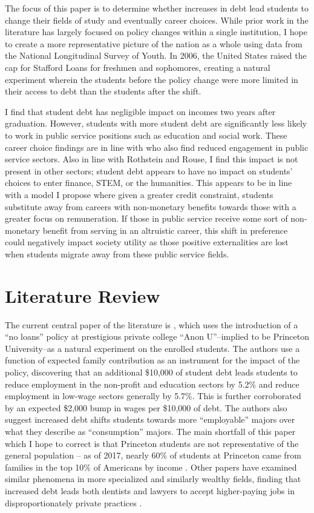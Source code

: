 \documentclass[12pt]{article}
\begin{document}
	The focus of this paper is to determine whether increases in debt lead students to change their fields of study and eventually career choices. While prior work in the literature has largely focused on policy changes within a single institution, I hope to create a more representative picture of the nation as a whole using data from the National Longitudinal Survey of Youth. In 2006, the United States raised the cap for Stafford Loans for freshmen and sophomores, creating a natural experiment wherein the students before the policy change were more limited in their access to debt than the students after the shift.
	
	I find that student debt has negligible impact on incomes two years after graduation. However, students with more student debt are significantly less likely to work in public service positions such as education and social work. These career choice findings are in line with \textcite{rothstein2011} who also find reduced engagement in public service sectors. Also in line with Rothstein and Rouse, I find this impact is not present in other sectors; student debt appears to have no impact on students' choices to enter finance, STEM, or the humanities. This appears to be in line with a model I propose where given a greater credit constraint, students substitute away from careers with non-monetary benefits towards those with a greater focus on remuneration. If those in public service receive some sort of non-monetary benefit from serving in an altruistic career, this shift in preference could negatively impact society utility as those positive externalities are lost when students migrate away from these public service fields.
	
	\section{Literature Review}
	
	The current central paper of the literature is \textcite{rothstein2011}, which uses the introduction of a ``no loans'' policy at prestigious private college ``Anon U''--implied to be Princeton University--as a natural experiment on the enrolled students. The authors use a function of expected family contribution as an instrument for the impact of the policy, discovering that an additional \$10,000 of student debt leads students to reduce employment in the non-profit and education sectors by 5.2\% and reduce employment in low-wage sectors generally by 5.7\%. This is further corroborated by an expected \$2,000 bump in wages per \$10,000 of debt. The authors also suggest increased debt shifts students towards more ``employable'' majors over what they describe as ``consumption'' majors. The main shortfall of this paper which I hope to correct is that Princeton students are not representative of the general population -- as of 2017, nearly 60\% of students at Princeton came from families in the top 10\% of Americans by income \parencite{aisch2017}. Other papers have examined similar phenomena in more specialized and similarly wealthy fields, finding that increased debt leads both dentists and lawyers to accept higher-paying jobs in disproportionately private practices \parencite{nicholson2015, field2009}.
	
\end{document}
